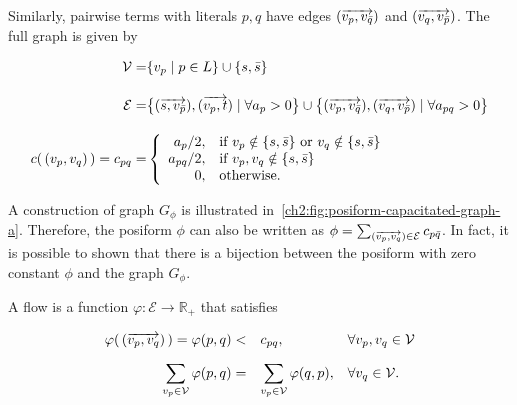 \begin{center}
\end{center}

Similarly, pairwise terms with literals $p,q$ have edges $( \overrightarrow{ v_p,v_{\bar{q}}} ) $ and $( \overrightarrow{ v_q,v_{\bar{p}}} )$. The full graph is given by

\begin{align*}
	\mathcal{V} =& \{ v_p \; | \; p \in L \} \cup \{s,\bar{s}\} \\[1em]
	\mathcal{E} =& \big\{ ( \overrightarrow{ s,v_{\bar{p}}} ),( \overrightarrow{ v_p,t} ) \; | \; \forall a_p>0 \big\} \cup \big\{ ( \overrightarrow{ v_p,v_{\bar{q}}} ), ( \overrightarrow{ v_q,v_{\bar{p}}} ) \; | \; \forall a_{pq} > 0 \big\}  \\[1em]
	c(\, (v_p,v_q)\, ) = c_{pq} =& \left\{ \begin{array}{rl}
		a_{p}/2, & \text{if } v_p \notin \{s,\bar{s}\} \text{ or } v_q \notin \{s,\bar{s}\} \\
		a_{pq}/2, & \text{if } v_p,v_q \notin \{s,\bar{s}\}\\ 
		0,& \text{otherwise}.
	\end{array}\right.
\end{align*}

A construction of graph $G_{\phi}$ is illustrated in~\cref{ch2:fig:posiform-capacitated-graph-a}. Therefore, the posiform $\phi$ can also be written as $\phi = \sum_{ ( \overrightarrow{ v_p,v_q} ) \in \mathcal{E}}{ c_{p\bar{q}} }$. In fact, it is possible to shown that there is a bijection between the posiform with zero constant $\phi$ and the graph $G_{\phi}$.


A flow is a function $\varphi:\mathcal{E}\rightarrow \mathbb{R}_{+}$ that satisfies

\begin{equation*}
	\begin{array}{rll}
	\displaystyle
	\varphi(\,( \overrightarrow{ v_p,v_q} )\,) = \varphi (p,q) <& c_{pq},&  \forall v_p,v_q \in \mathcal{V} \\[1em]
	\displaystyle
	\sum_{v_p \in \mathcal{V}}{\varphi(p,q)} =& \displaystyle \sum_{v_p \in \mathcal{V}}{\varphi (q,p)}, & \forall v_q \in \mathcal{V}.	
	\end{array}
\end{equation*}


